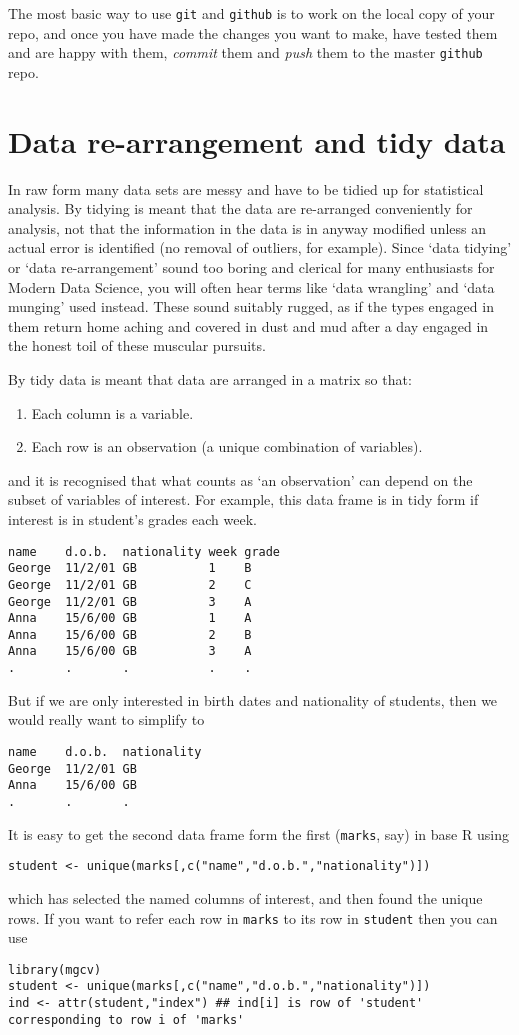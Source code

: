 \documentclass[10pt] {article}
\theoremstyle{definition}
\begin{document}
The most basic way to use {\tt git} and {\tt github} is to work on the local copy of your repo, and once you have made the changes you want to make, have tested them and are happy with them, {\em commit} them and {\em push} them to the master {\tt github} repo. 



\section{Data re-arrangement and tidy data}

In raw form many data sets are messy and have to be tidied up for statistical analysis. By tidying is meant that the data are re-arranged conveniently for analysis, not that the information in the data is in anyway modified unless an actual error is identified (no removal of outliers, for example). Since `data tidying' or `data re-arrangement' sound too boring and clerical for many enthusiasts for Modern Data Science, you will often hear terms like `data wrangling' and `data munging' used instead. These sound suitably rugged, as if the types engaged in them return home aching and covered in dust and mud after a day engaged in the honest toil of these muscular pursuits.

By tidy data is meant that data are arranged in a matrix so that:
\begin{enumerate}
\item Each column is a variable.
\item Each row is an observation (a unique combination of variables).
\end{enumerate}
and it is recognised that what counts as `an observation' can depend on the subset of variables of interest. For example,
this data frame is in tidy form if interest is in student's grades each week. 
\begin{verbatim}
name    d.o.b.  nationality week grade
George  11/2/01 GB          1    B
George  11/2/01 GB          2    C
George  11/2/01 GB          3    A
Anna    15/6/00 GB          1    A
Anna    15/6/00 GB          2    B
Anna    15/6/00 GB          3    A
.       .       .           .    .
\end{verbatim}
But if we are only interested in birth dates and nationality of students, then we would really want to simplify to
\begin{verbatim}
name    d.o.b.  nationality 
George  11/2/01 GB          
Anna    15/6/00 GB          
.       .       .           
\end{verbatim}
It is easy to get the second data frame form the first (\verb+marks+, say) in base R using
\begin{verbatim}
student <- unique(marks[,c("name","d.o.b.","nationality")])
\end{verbatim}
which has selected the named columns of interest, and then found the unique rows. If you want to refer each row in \verb+marks+ to its row in \verb+student+ then you can use 
\begin{verbatim}
library(mgcv)
student <- unique(marks[,c("name","d.o.b.","nationality")])
ind <- attr(student,"index") ## ind[i] is row of 'student' corresponding to row i of 'marks'
\end{verbatim}
\end{document}
